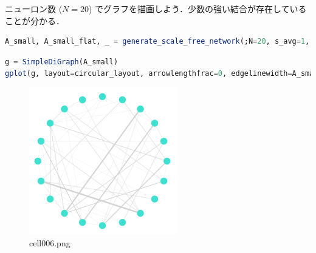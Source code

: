 ニューロン数 ($N=20$) でグラフを描画しよう．少数の強い結合が存在していることが分かる．
\begin{lstlisting}[language=julia]
A_small, A_small_flat, _ = generate_scale_free_network(;N=20, s_avg=1, p=0.5, num_iter=1000, num_prune_edge=1)
\end{lstlisting}
\begin{lstlisting}[language=julia]
g = SimpleDiGraph(A_small)
gplot(g, layout=circular_layout, arrowlengthfrac=0, edgelinewidth=A_small_flat, plot_size=(5cm,5cm))
\end{lstlisting}

\begin{figure}[ht]
	\centering
	\includegraphics[scale=0.8, max width=\linewidth]{./fig/local-learning-rule/heavy-tail/cell006.png}
	\caption{cell006.png}
	\label{cell006.png}
\end{figure}


